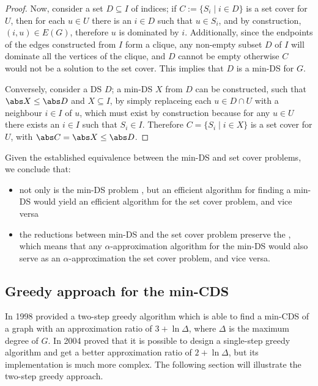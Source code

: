 \documentclass[a4paper, 12pt]{report}
\begin{document}
\begin{proof}
        Now, consider a set $D \subseteq I$ of indices; if $C := \{S_i \mid i \in D\}$ is a set cover for $U$, then for each $u \in U$ there is an $i \in D$ such that $u \in S_i$, and by construction, $(i, u) \in E(G)$, therefore $u$ is dominated by $i$. Additionally, since the endpoints of the edges constructed from $I$ form a clique, any non-empty subset $D$ of $I$ will dominate all the vertices of the clique, and $D$ cannot be empty otherwise $C$ would not be a solution to the set cover. This implies that $D$ is a min-DS for $G$.

        Conversely, consider a DS $D$; a min-DS $X$ from $D$ can be constructed, such that $\abs X \le \abs D$ and $X \subseteq I$, by simply replaceing each $u \in D \cap U$ with a neighbour $i \in I$ of $u$, which must exist by construction because for any $u \in U$ there exists an $i \in I$ such that $S_i \in I$. Therefore $C = \{S_i \mid i \in X\}$ is a set cover for $U$, with $\abs C = \abs X \le \abs D$.
    \end{proof}

    Given the established equivalence between the min-DS and set cover problems, we conclude that:

    \begin{itemize}
        \item not only is the min-DS problem \NPComplete, but an efficient algorithm for finding a min-DS would yield an efficient algorithm for the set cover problem, and vice versa
        \item the reductions between min-DS and the set cover problem preserve the , which means that any $\alpha$-approximation algorithm for the min-DS would also serve as an $\alpha$-approximation the set cover problem, and vice versa.
    \end{itemize}

    \subsection{Greedy approach for the min-CDS}

    In 1998 \textcite{guha} provided a two-step greedy algorithm which is able to find a min-CDS of a graph with an approximation ratio of $3 + \ln \Delta$, where $\Delta$ is the maximum degree of $G$. In 2004 \textcite{ruan} proved that it is possible to design a single-step greedy algorithm and get a better approximation ratio of $2 + \ln \Delta$, but its implementation is much more complex. The following section will illustrate the two-step greedy approach.
\end{document}
